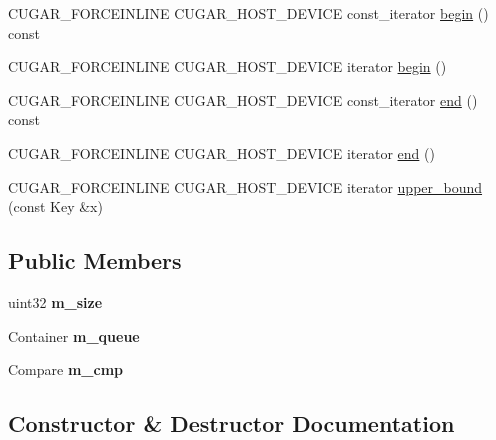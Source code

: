 \begin{DoxyCompactItemize}
C\+U\+G\+A\+R\+\_\+\+F\+O\+R\+C\+E\+I\+N\+L\+I\+NE C\+U\+G\+A\+R\+\_\+\+H\+O\+S\+T\+\_\+\+D\+E\+V\+I\+CE const\+\_\+iterator \hyperlink{structcugar_1_1priority__queue_a9311ca225c87bcb2b5681cd10f033881}{begin} () const
\item 
C\+U\+G\+A\+R\+\_\+\+F\+O\+R\+C\+E\+I\+N\+L\+I\+NE C\+U\+G\+A\+R\+\_\+\+H\+O\+S\+T\+\_\+\+D\+E\+V\+I\+CE iterator \hyperlink{structcugar_1_1priority__queue_a5b3729e96e1f4e05bf2f7e08f0c821b0}{begin} ()
\item 
C\+U\+G\+A\+R\+\_\+\+F\+O\+R\+C\+E\+I\+N\+L\+I\+NE C\+U\+G\+A\+R\+\_\+\+H\+O\+S\+T\+\_\+\+D\+E\+V\+I\+CE const\+\_\+iterator \hyperlink{structcugar_1_1priority__queue_a1ffb30afe7e85d8b1ccb10446cae678d}{end} () const
\item 
C\+U\+G\+A\+R\+\_\+\+F\+O\+R\+C\+E\+I\+N\+L\+I\+NE C\+U\+G\+A\+R\+\_\+\+H\+O\+S\+T\+\_\+\+D\+E\+V\+I\+CE iterator \hyperlink{structcugar_1_1priority__queue_a2e23a349f2e9092a2fe0b1593a91f03a}{end} ()
\item 
C\+U\+G\+A\+R\+\_\+\+F\+O\+R\+C\+E\+I\+N\+L\+I\+NE C\+U\+G\+A\+R\+\_\+\+H\+O\+S\+T\+\_\+\+D\+E\+V\+I\+CE iterator \hyperlink{structcugar_1_1priority__queue_a31cc4b1e4f45712ec454ef62052db97a}{upper\+\_\+bound} (const Key \&x)
\end{DoxyCompactItemize}
\subsection*{Public Members}
\begin{DoxyCompactItemize}
\item 
\mbox{\label{structcugar_1_1priority__queue_aa55e95734379e6facb7cd3f3ebdcb9ad}} 
uint32 {\bfseries m\+\_\+size}
\item 
\mbox{\label{structcugar_1_1priority__queue_a382b4bcc1754ef6f662975bada2fc168}} 
Container {\bfseries m\+\_\+queue}
\item 
\mbox{\label{structcugar_1_1priority__queue_af6af20a53f5c0fb4134c8c916d31613d}} 
Compare {\bfseries m\+\_\+cmp}
\end{DoxyCompactItemize}


\subsection{Constructor \& Destructor Documentation}
\mbox{\label{structcugar_1_1priority__queue_ac27881d03a273accfa84ddf946c0466b}} 
